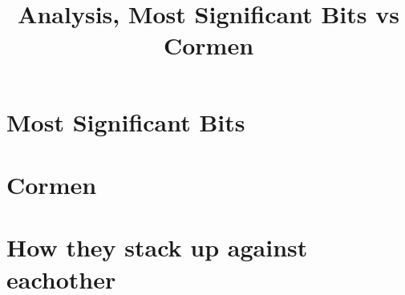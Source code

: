 \documentclass{article}
\title{Analysis, Most Significant Bits vs Cormen}
\begin{document}
\maketitle

\section*{Most Significant Bits}

\section*{Cormen}

\section*{How they stack up against eachother}
\end{document}
